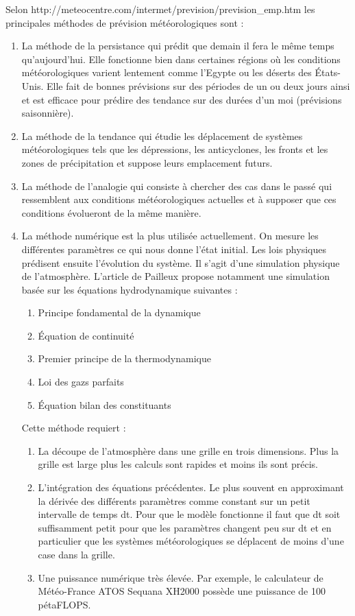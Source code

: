 \documentclass[11pt,a4paper]{article}
\begin{document}
Selon http://meteocentre.com/intermet/prevision/prevision\_emp.htm
les principales méthodes de prévision météorologiques sont :
\begin{enumerate}
\item La méthode de la persistance qui prédit que demain il fera le même temps qu'aujourd'hui. Elle fonctionne bien dans certaines régions où les conditions météorologiques varient lentement comme	l'Egypte ou les déserts des États-Unis. Elle fait de bonnes prévisions sur des périodes de un ou deux jours ainsi et est efficace pour prédire des tendance sur des durées d'un moi (prévisions saisonnière). 
\item La méthode de la tendance qui étudie les déplacement de systèmes météorologiques tels que les dépressions, les anticyclones, les fronts et les zones de précipitation et suppose leurs emplacement futurs.
\item La méthode de l'analogie qui consiste à chercher des cas dans le passé qui ressemblent aux conditions météorologiques actuelles et à supposer que ces conditions évolueront de la même manière.
\item La méthode numérique est la plus utilisée actuellement. On mesure les différentes paramètres ce qui nous donne l'état initial. Les lois physiques prédisent ensuite l'évolution du système. Il s'agit d'une simulation physique de l'atmosphère. L'article de Pailleux \cite{PAILLEUX}
 propose notamment une simulation basée sur les équations hydrodynamique suivantes : \begin {enumerate}
\item Principe fondamental de la dynamique
\item Équation de continuité
\item Premier principe de la thermodynamique
\item Loi des gazs parfaits
\item Équation bilan des constituants
\end {enumerate}
Cette méthode requiert :
\begin{enumerate} 
\item La découpe de l'atmosphère dans une grille en trois dimensions. Plus la grille est large plus les calculs sont rapides et moins ils sont précis.
\item L'intégration des équations précédentes. Le plus souvent en approximant la dérivée des différents paramètres comme constant sur un petit intervalle de temps dt. Pour que le modèle fonctionne il faut que dt soit suffisamment petit pour que les paramètres changent peu sur dt et en particulier que les systèmes météorologiques se déplacent de moins d'une case dans la grille.
\item Une puissance numérique très élevée. Par exemple, le calculateur de Météo-France ATOS Sequana XH2000 possède une puissance de 100 pétaFLOPS. 
\end {enumerate}
\end{enumerate}
\end{document}
